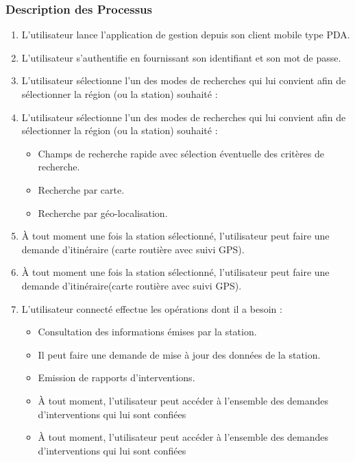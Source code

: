 \subsubsection{Description des Processus}

\begin{enumerate}
\item L'utilisateur lance l'application de gestion depuis son client mobile type PDA.
\item L'utilisateur s'authentifie en fournissant son identifiant et son mot de passe.

\item L'utilisateur sélectionne l'un des modes de recherches qui lui convient afin de sélectionner
 la région (ou la station) souhaité :

\item L'utilisateur sélectionne l'un des modes de recherches qui lui convient afin de sélectionner la région (ou la station) souhaité :

	\begin{itemize}
	\item Champs de recherche rapide avec sélection éventuelle des critères de recherche.

	\item Recherche par carte.

	\item Recherche par géo-localisation.
	
	\end{itemize}


	\item À tout moment une fois la station sélectionné, l'utilisateur peut faire une demande 
	d'itinéraire (carte routière avec suivi GPS).

	\item À tout moment une fois la station sélectionné, l'utilisateur peut faire une demande d'itinéraire(carte routière avec suivi GPS).

	\item L'utilisateur connecté effectue les opérations dont il a besoin :
	
	\begin{itemize}
	\item Consultation des informations émises par la station. 
	\item Il peut faire une demande de mise à jour des données de la station.
	\item Emission de rapports d'interventions.

    \item À tout moment, l'utilisateur peut accéder à l'ensemble des demandes d'interventions 
    qui lui sont confiées

    \item À tout moment, l'utilisateur peut accéder à l'ensemble des demandes d'interventions qui lui sont confiées

	\end{itemize}
\end{enumerate}


